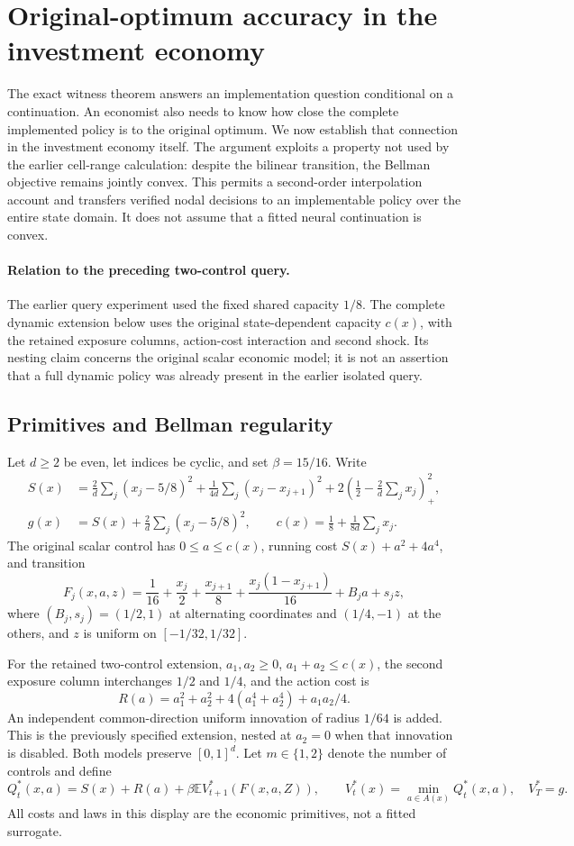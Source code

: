 \section{Original-optimum accuracy in the investment economy}\label{sec:accuracy62}
The exact witness theorem answers an implementation question conditional on a continuation. An economist also needs to know how close the complete implemented policy is to the original optimum. We now establish that connection in the investment economy itself. The argument exploits a property not used by the earlier cell-range calculation: despite the bilinear transition, the Bellman objective remains jointly convex. This permits a second-order interpolation account and transfers verified nodal decisions to an implementable policy over the entire state domain. It does not assume that a fitted neural continuation is convex.

\paragraph{Relation to the preceding two-control query.}
The earlier query experiment used the fixed shared capacity $1/8$. The complete dynamic extension below uses the original state-dependent capacity $c(x)$, with the retained exposure columns, action-cost interaction and second shock. Its nesting claim concerns the original scalar economic model; it is not an assertion that a full dynamic policy was already present in the earlier isolated query.

\subsection{Primitives and Bellman regularity}
Let $d\ge2$ be even, let indices be cyclic, and set $\beta=15/16$. Write
\begin{align*}
 S(x)&=\frac2d\sum_j(x_j-5/8)^2+
       \frac1{4d}\sum_j(x_j-x_{j+1})^2+
       2\left(\frac12-\frac2d\sum_jx_j\right)_+^2,\\
 g(x)&=S(x)+\frac2d\sum_j(x_j-5/8)^2,\qquad
 c(x)=\frac18+\frac1{8d}\sum_jx_j.
\end{align*}
The original scalar control has $0\le a\le c(x)$, running cost $S(x)+a^2+4a^4$, and transition
\[
 F_j(x,a,z)=\frac1{16}+\frac{x_j}{2}+\frac{x_{j+1}}8+
       \frac{x_j(1-x_{j+1})}{16}+B_ja+s_jz,
\]
where $(B_j,s_j)=(1/2,1)$ at alternating coordinates and $(1/4,-1)$ at the others, and $z$ is uniform on $[-1/32,1/32]$.

For the retained two-control extension, $a_1,a_2\ge0$, $a_1+a_2\le c(x)$, the second exposure column interchanges $1/2$ and $1/4$, and the action cost is
\[
 R(a)=a_1^2+a_2^2+4(a_1^4+a_2^4)+a_1a_2/4.
\]
An independent common-direction uniform innovation of radius $1/64$ is added. This is the previously specified extension, nested at $a_2=0$ when that innovation is disabled. Both models preserve $[0,1]^d$. Let $m\in\{1,2\}$ denote the number of controls and define
\[
 Q_t^*(x,a)=S(x)+R(a)+\beta\mathbb E V_{t+1}^*(F(x,a,Z)),
 \qquad V_t^*(x)=\min_{a\in A(x)}Q_t^*(x,a),\quad V_T^*=g.
\]
All costs and laws in this display are the economic primitives, not a fitted surrogate.

